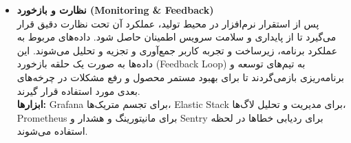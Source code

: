 \begin{itemize}
    \item \textbf{نظارت و بازخورد (Monitoring \& Feedback)} \\
    پس از استقرار نرم‌افزار در محیط تولید، عملکرد آن تحت نظارت دقیق قرار می‌گیرد تا از پایداری و سلامت سرویس اطمینان حاصل شود. داده‌های مربوط به عملکرد برنامه، زیرساخت و تجربه کاربر جمع‌آوری و تجزیه و تحلیل می‌شوند. این داده‌ها به صورت یک حلقه بازخورد (Feedback Loop) به تیم‌های توسعه و برنامه‌ریزی بازمی‌گردند تا برای بهبود مستمر محصول و رفع مشکلات در چرخه‌های بعدی مورد استفاده قرار گیرند. \\
    \textbf{ابزارها:} Grafana برای تجسم متریک‌ها، Elastic Stack برای مدیریت و تحلیل لاگ‌ها، Prometheus برای مانیتورینگ و هشدار و Sentry برای ردیابی خطاها در لحظه استفاده می‌شوند.
\end{itemize}
